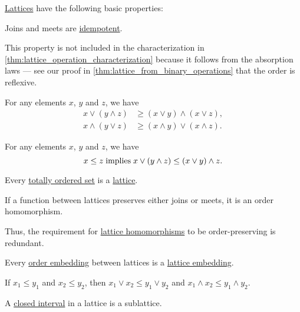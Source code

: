 \begin{proposition}\label{thm:def:lattice}
  \hyperref[def:lattice]{Lattices} have the following basic properties:
  \begin{thmenum}
     Joins and meets are \hyperref[def:binary_operation/idempotent]{idempotent}.

    This property is not included in the characterization in \cref{thm:lattice_operation_characterization} because it follows from the absorption laws --- see our proof in \cref{thm:lattice_from_binary_operations} that the order is reflexive.

     For any elements \( x \), \( y \) and \( z \), we have
    \begin{align}
      x \vee (y \wedge z) &\geq (x \vee y) \wedge (x \vee z), \label{eq:thm:def:lattice/distributive_inequality/join_over_meet} \\
      x \wedge (y \vee z) &\geq (x \wedge y) \vee (x \wedge z). \label{eq:thm:def:lattice/distributive_inequality/meet_over_join}
    \end{align}

     For any elements \( x \), \( y \) and \( z \), we have
    \begin{equation}\label{eq:thm:def:lattice/modular_inequality}
      x \leq z \T{implies} x \vee (y \wedge z) \leq (x \vee y) \wedge z.
    \end{equation}

     Every \hyperref[def:totally_ordered_set]{totally ordered set} is a \hyperref[def:lattice]{lattice}.

     If a function between lattices preserves either joins or meets, it is an order homomorphism.

    Thus, the requirement for \hyperref[def:lattice/homomorphism]{lattice homomorphisms} to be order-preserving is redundant.

     Every \hyperref[def:preordered_set/homomorphism]{order embedding} between lattices is a \hyperref[def:lattice/homomorphism]{lattice embedding}.

     If \( x_1 \leq y_1 \) and \( x_2 \leq y_2 \), then \( x_1 \vee x_2 \leq y_1 \vee y_2 \) and \( x_1 \wedge x_2 \leq y_1 \wedge y_2 \).

     A \hyperref[def:order_interval/closed]{closed interval} in a lattice is a sublattice.
  \end{thmenum}
\end{proposition}
